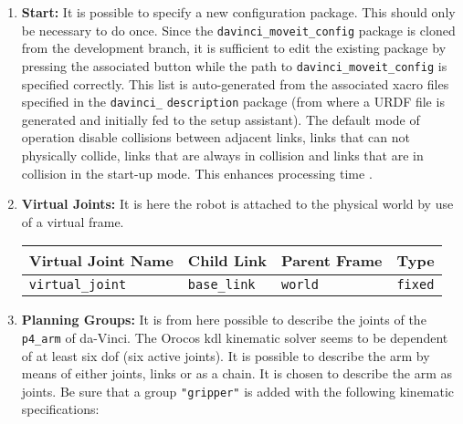 \begin{enumerate}
\item \textbf{Start:} It is possible to specify a new configuration package. This should only be necessary to do once. Since the \texttt{davinci\_moveit\_config} package is cloned from the development branch, it is sufficient to edit the existing package by pressing the associated button while the path to \texttt{davinci\_moveit\_config} is specified correctly.
This list is auto-generated from the associated xacro files specified in the \texttt{davinci\_} \texttt{description} package (from where a URDF file is generated and initially fed to the setup assistant). The default mode of operation disable collisions between adjacent links, links that can not physically collide, links that are always in collision and links that are in collision in the start-up mode. This enhances processing time \citep{bib:setup_assistant}. %
\item \textbf{Virtual Joints:} It is here the robot is attached to the physical world by use of a virtual frame. %
\begin{table}[H]
\hspace{1cm}\begin{tabular}{l|l|l|l}
\textbf{Virtual Joint Name} & \textbf{Child Link}  & \textbf{Parent Frame}  & \textbf{Type}   \\
\hline
 \texttt{virtual\_joint} & \texttt{base\_link}  & \texttt{world}  &  \texttt{fixed} \\
\end{tabular}
\end{table}
\item \textbf{Planning Groups:} It is from here possible to describe the joints of the \texttt{p4\_arm} of da-Vinci. The Orocos \gls{kdl} kinematic solver seems to be dependent of at least six \gls{dof} (six active joints). It is possible to describe the arm by means of either joints, links or as a chain. It is chosen to describe the arm as joints. Be sure that a group \texttt{"gripper"} is added with the following kinematic specifications:

\end{enumerate}
